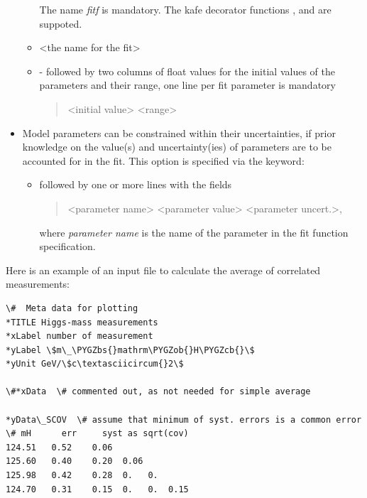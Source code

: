 \documentclass[a4paper,10pt,english]{sphinxmanual}
\def\PYGZbs{\char`\\}
\def\PYGZob{\char`\{}
\def\PYGZcb{\char`\}}
\begin{document}
\begin{fulllineitems}
\begin{itemize}
\begin{itemize}
The name \emph{fitf} is mandatory. The kafe decorator functions
,  and 
are suppoted.

\item {} 
 \textless{}the name for the fit\textgreater{}

\item {} 
 -  followed by two columns of float values
for the initial values of the parameters and their range, one line
per fit parameter is mandatory
\begin{quote}

\textless{}initial value\textgreater{}  \textless{}range\textgreater{}
\end{quote}

\end{itemize}

\item {} 
Model parameters can be constrained within their uncertainties, if prior
knowledge on the value(s) and uncertainty(ies) of parameters are
to be accounted for in the fit. This option is specified via the
keyword:
\begin{itemize}
\item {} 
 followed by one or more lines with
the fields
\begin{quote}

\textless{}parameter name\textgreater{}  \textless{}parameter value\textgreater{}  \textless{}parameter uncert.\textgreater{},
\end{quote}

where \emph{parameter name} is the name of the parameter in the fit
function specification.

\end{itemize}

\end{itemize}

Here is an example of an input file to calculate the average
of correlated measurements:

\begin{Verbatim}[commandchars=\\\{\}]
\#  Meta data for plotting
*TITLE Higgs-mass measurements
*xLabel number of measurement
*yLabel \$m\_\PYGZbs{}mathrm\PYGZob{}H\PYGZcb{}\$
*yUnit GeV/\$c\textasciicircum{}2\$

\#*xData  \# commented out, as not needed for simple average

*yData\_SCOV  \# assume that minimum of syst. errors is a common error
\# mH      err     syst as sqrt(cov)
124.51   0.52    0.06
125.60   0.40    0.20  0.06
125.98   0.42    0.28  0.   0.
124.70   0.31    0.15  0.   0.  0.15


\end{Verbatim}
\end{fulllineitems}
\end{document}
